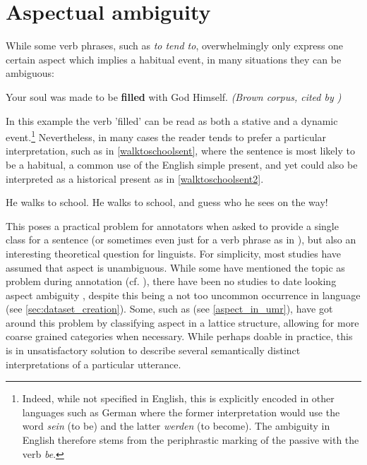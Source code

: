 \section{Aspectual ambiguity}
While some verb phrases, such as \emph{to tend to}, overwhelmingly only express one certain aspect which implies a habitual event, in many situations they can be ambiguous:
\begin{exe}
    \ex Your soul was made to be \textbf{filled} with God Himself. \emph{(Brown corpus, cited by \citet{Friedrich2014AutomaticPO})}
\end{exe}
In this example the verb 'filled' can be read as both a stative and a dynamic event.\footnote{Indeed, while not specified in English, this is explicitly encoded in other languages such as German where the former interpretation would use the word \emph{sein} (to be) and the latter \emph{werden} (to become). The ambiguity in English therefore stems from the periphrastic marking of the passive with the verb \emph{be}.} Nevertheless, in many cases the reader tends to prefer a particular interpretation, such as in \ref{walktoschoolsent}, where the sentence is most likely to be a habitual, a common use of the English simple present, and yet could also be interpreted as a historical present as in \ref{walktoschoolsent2}.

\begin{exe}
    \ex He walks to school.
    \label{walktoschoolsent}
    \ex He walks to school, and guess who he sees on the way!
    \label{walktoschoolsent2}
\end{exe}

This poses a practical problem for annotators when asked to provide a single class for a sentence (or sometimes even just for a verb phrase as in \citet{siegel-mckeown-2000-learning}), but also an interesting theoretical question for linguists. For simplicity, most studies have assumed that aspect is unambiguous. While some have mentioned the topic as problem during annotation (cf. \citet{croft-etal-2016-annotation, Friedrich2014AutomaticPO}), there have been no studies to date looking aspect ambiguity \citep{friedrich-etal-2023-kind}, despite this being a not too uncommon occurrence in language (see \ref{sec:dataset_creation}). Some, such as \citet{umr} (see \ref{aspect_in_umr}), have got around this problem by classifying aspect in a lattice structure, allowing for more coarse grained categories when necessary. While perhaps doable in practice, this is in unsatisfactory solution to describe several semantically distinct interpretations of a particular utterance.

